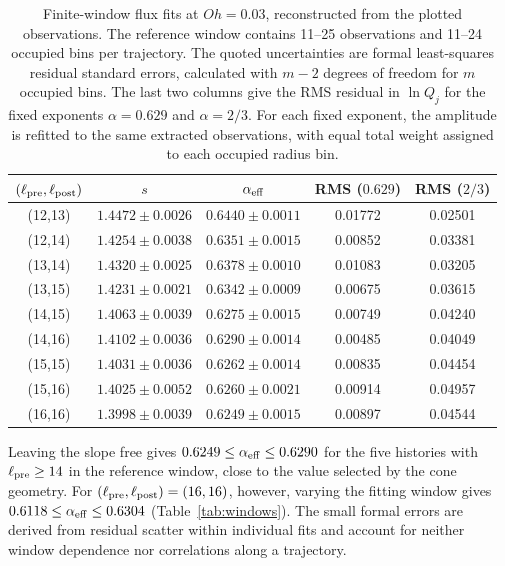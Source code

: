 \documentclass[10pt]{article}
\begin{document}
\begin{table}[ht]
\centering
\begin{tabular}{ccccc}
\toprule
$(\ell_{\rm pre},\ell_{\rm post})$ & $s$ & $\alpha_{\rm eff}$ & RMS ($0.629$) & RMS ($2/3$)\\
\midrule
(12,13) & $1.4472\pm0.0026$ & $0.6440\pm0.0011$ & 0.01772 & 0.02501\\
(12,14) & $1.4254\pm0.0038$ & $0.6351\pm0.0015$ & 0.00852 & 0.03381\\
(13,14) & $1.4320\pm0.0025$ & $0.6378\pm0.0010$ & 0.01083 & 0.03205\\
(13,15) & $1.4231\pm0.0021$ & $0.6342\pm0.0009$ & 0.00675 & 0.03615\\
(14,15) & $1.4063\pm0.0039$ & $0.6275\pm0.0015$ & 0.00749 & 0.04240\\
(14,16) & $1.4102\pm0.0036$ & $0.6290\pm0.0014$ & 0.00485 & 0.04049\\
(15,15) & $1.4031\pm0.0036$ & $0.6262\pm0.0014$ & 0.00835 & 0.04454\\
(15,16) & $1.4025\pm0.0052$ & $0.6260\pm0.0021$ & 0.00914 & 0.04957\\
(16,16) & $1.3998\pm0.0039$ & $0.6249\pm0.0015$ & 0.00897 & 0.04544\\
\bottomrule
\end{tabular}
\caption{Finite-window flux fits at $Oh=0.03$, reconstructed from the plotted observations. The reference window contains 11--25 observations and 11--24 occupied bins per trajectory. The quoted uncertainties are formal least-squares residual standard errors, calculated with $m-2$ degrees of freedom for $m$ occupied bins. The last two columns give the RMS residual in $\ln Q_j$ for the fixed exponents $\alpha=0.629$ and $\alpha=2/3$. For each fixed exponent, the amplitude is refitted to the same extracted observations, with equal total weight assigned to each occupied radius bin.}
\label{tab:flux}
\end{table}

Leaving the slope free gives $0.6249\le\alpha_{\rm eff}\le0.6290$ for the five histories with $\ell_{\rm pre}\ge14$ in the reference window, close to the value selected by the cone geometry. For $(\ell_{\rm pre},\ell_{\rm post})=(16,16)$, however, varying the fitting window gives $0.6118\le\alpha_{\rm eff}\le0.6304$ (Table~\ref{tab:windows}). The small formal errors are derived from residual scatter within individual fits and account for neither window dependence nor correlations along a trajectory.
\end{document}
